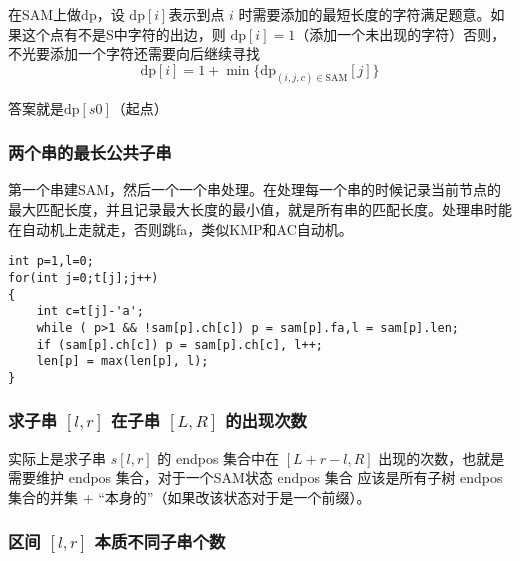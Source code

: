 \par \noindent 在SAM上做dp，设 $\text{dp}[i]$表示到点 $i$ 时需要添加的最短长度的字符满足题意。如果这个点有不是S中字符的出边，则 $\text{dp}[i]=1$（添加一个未出现的字符）否则，不光要添加一个字符还需要向后继续寻找
$$
\text{dp}[i]=1+\min\{\text{dp}_{(i,j,c)\in\text{SAM}}[j]\}
$$

\par \noindent 答案就是$\text{dp}[s0]$（起点）

\subsubsection{两个串的最长公共子串}
\par \noindent 第一个串建SAM，然后一个一个串处理。在处理每一个串的时候记录当前节点的最大匹配长度，并且记录最大长度的最小值，就是所有串的匹配长度。处理串时能在自动机上走就走，否则跳fa，类似KMP和AC自动机。

\begin{verbatim}
int p=1,l=0;
for(int j=0;t[j];j++)
{
    int c=t[j]-'a';
    while ( p>1 && !sam[p].ch[c]) p = sam[p].fa,l = sam[p].len;
    if (sam[p].ch[c]) p = sam[p].ch[c], l++;
    len[p] = max(len[p], l);
}
\end{verbatim}
\subsubsection{求子串 $[l, r]$ 在子串 $[L, R]$ 的出现次数}
\par \noindent 实际上是求子串 $s[l,r]$ 的 endpos 集合中在 $[L+r-l,R]$ 出现的次数，也就是需要维护 endpos 集合，对于一个SAM状态 endpos 集合 应该是所有子树 endpos 集合的并集 + “本身的”（如果改该状态对于是一个前缀）。
\subsubsection{区间 $[l, r]$ 本质不同子串个数}

